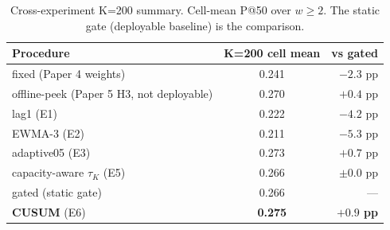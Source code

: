 \begin{table}[!t]
  \caption{Cross-experiment K=200 summary. Cell-mean P@50 over
  $w \geq 2$. The static gate (deployable baseline) is the comparison.}
  \label{tab:summary}
  \centering
  \small
  \setlength{\tabcolsep}{5pt}
  \setlength{\tabcolsep}{4pt}
  \begin{tabular}{@{}p{4.0cm}cr@{}}
    \toprule
    \textbf{Procedure} & \textbf{K=200 cell mean} & \textbf{vs gated} \\
    \midrule
    fixed (Paper 4 weights)          & 0.241 & $-2.3$ pp \\
    offline-peek (Paper 5 H3, not deployable) & 0.270 & $+0.4$ pp \\
    lag1 (E1)                        & 0.222 & $-4.2$ pp \\
    EWMA-3 (E2)                      & 0.211 & $-5.3$ pp \\
    adaptive05 (E3)                  & 0.273 & $+0.7$ pp \\
    capacity-aware $\tau_K$ (E5)     & 0.266 & $\pm 0.0$ pp \\
    gated (static gate)              & 0.266 & --- \\
    \textbf{CUSUM} (E6)              & \textbf{0.275} & \textbf{$+0.9$ pp} \\
    \bottomrule
  \end{tabular}
\end{table}
